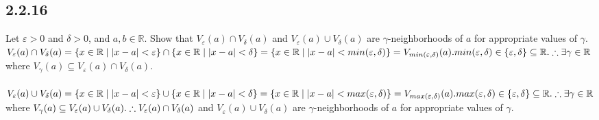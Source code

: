 \documentclass{article}
\begin{document}
\subsection{2.2.16}
Let $\varepsilon > 0$ and $\delta > 0$, and $a, b \in \mathbb{R}$. Show that
$V_\varepsilon(a) \cap V_\delta(a)$ and $ V_\varepsilon(a) \cup V_\delta(a)$
are $\gamma$-neighborhoods of $a$ for appropriate values of $\gamma$.
\\$V_\varepsilon(a) \cap V_\delta(a) =
\{x \in \mathbb{R} \mid |x-a| < \varepsilon\} \cap
\{x \in \mathbb{R} \mid |x-a| < \delta\} =
\\\{x \in \mathbb{R} \mid |x-a| < min(\varepsilon, \delta)\} = 
V_{min(\varepsilon, \delta)}(a).
\\min(\varepsilon, \delta) \in \{\varepsilon, \delta\} \subseteq \mathbb{R}.
\\\therefore \exists \gamma \in \mathbb{R}$ where $V_\gamma(a) \subseteq
V_\varepsilon(a) \cap V_\delta(a)$.
\\
\\$V_\varepsilon(a) \cup V_\delta(a) =
\{x \in \mathbb{R} \mid |x-a| < \varepsilon\} \cup
\{x \in \mathbb{R} \mid |x-a| < \delta\} =
\\\{x \in \mathbb{R} \mid |x-a| < max(\varepsilon, \delta)\} = 
V_{max(\varepsilon, \delta)}(a).
\\max(\varepsilon, \delta) \in \{\varepsilon, \delta\} \subseteq \mathbb{R}.
\\\therefore \exists \gamma \in \mathbb{R}$ where $V_\gamma(a) \subseteq
V_\varepsilon(a) \cup V_\delta(a).
\\
\\\therefore V_\varepsilon(a) \cap V_\delta(a)$ and $ V_\varepsilon(a) \cup
V_\delta(a)$ are $\gamma$-neighborhoods of $a$ for appropriate values of
$\gamma$.
\end{document}
